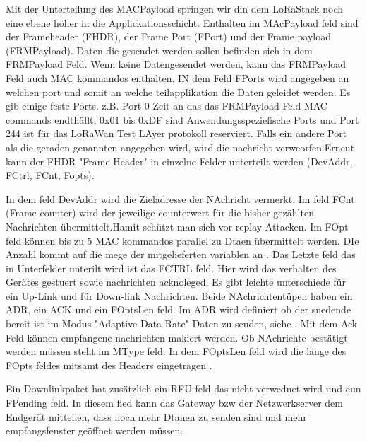\documentclass[a4paper,12pt]{article}
\begin{document}
            Mit der Unterteilung des  MACPayload springen wir din dem LoRaStack noch eine ebene höher in die Applickationsschicht. Enthalten im MAcPayload feld sind der Frameheader (FHDR), der Frame Port (FPort) und der Frame payload (FRMPayload). Daten die gesendet werden sollen befinden sich in dem FRMPayload Feld. Wenn keine Datengesendet werden, kann das FRMPayload Feld auch MAC kommandos enthalten. IN dem Feld FPorts   wird angegeben an welchen 
            port und somit an welche teilapplikation die Daten geleidet werden. Es gib einige feste Ports. z.B. Port 0 Zeit an das das FRMPayload Feld MAC commands endthällt, 0x01 bis 0xDF sind Anwendungsspeziefische Ports und Port 244  ist für das LoRaWan Test LAyer protokoll reserviert. Falls ein andere Port als die geraden genannten angegeben wird, wird die nachricht verweorfen.Erneut kann der FHDR "Frame Header" in einzelne Felder unterteilt werden (DevAddr, FCtrl, FCnt, Fopts). 
            
            In dem feld DevAddr wird die Zieladresse der NAchricht vermerkt.  Im feld FCnt (Frame counter) wird der jeweilige counterwert für die bisher gezählten Nachrichten übermittelt.Hamit schützt man sich vor replay Attacken. Im FOpt feld können bis zu 5 MAC kommandos parallel zu Dtaen übermittelt werden. DIe Anzahl kommt auf die mege der mitgelieferten variablen an .
            Das Letzte feld das in Unterfelder unterilt wird ist das FCTRL feld. Hier wird das verhalten des Gerätes gestuert sowie nachrichten acknoleged. Es gibt leichte unterschiede für ein Up-Link und für Down-link Nachrichten. Beide NAchrichtentüpen haben ein ADR, ein ACK und ein FOptsLen feld. Im ADR wird definiert ob der snedende bereit ist im Modus "Adaptive Data Rate" Daten zu senden, siehe . Mit dem Ack Feld können empfangene nachrichten makiert werden. Ob NAchrichte bestätigt werden müssen steht im MType feld.
            In dem FOptsLen feld wird die länge des FOpts feldes mitsamt des Headers eingetragen .

            Ein Downlinkpaket hat zusätzlich ein RFU feld das nicht verwednet wird und eun FPending feld. In diesem fled kann das Gateway bzw der Netzwerkserver dem Endgerät mitteilen, dass noch mehr Dtanen zu senden sind und mehr empfangsfenster geöffnet werden müssen.
\end{document}
